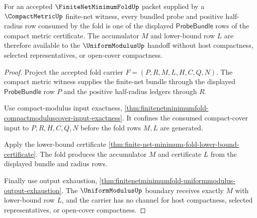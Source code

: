 \begin{theorem}
\label{thm:finitenetminimumfold-compactmetric-probe-consumption}
For an accepted $\FiniteNetMinimumFoldUp$ packet supplied by a $\CompactMetricUp$ finite-net witness, every bundled probe and positive half-radius row consumed by the fold is one of the displayed $\mathsf{ProbeBundle}$ rows of the compact metric certificate. The accumulator $M$ and lower-bound row $L$ are therefore available to the $\UniformModulusUp$ handoff without host compactness, selected representatives, or open-cover compactness.
\end{theorem}
\begin{proof}
Project the accepted fold carrier $F=(P,R,M,L,H,C,Q,N)$. The compact metric witness supplies the finite-net bundle through the displayed $\mathsf{ProbeBundle}$ row $P$ and the positive half-radius ledgers through $R$.

Use compact-modulus input exactness, \autoref{thm:finitenetminimumfold-compactmoduluscover-input-exactness}. It confines the consumed compact-cover input to $P,R,H,C,Q,N$ before the fold rows $M,L$ are generated.

Apply the lower-bound certificate \autoref{thm:finite-net-minimum-fold-lower-bound-certificate}. The fold produces the accumulator $M$ and certificate $L$ from the displayed bundle and radius rows.

Finally use output exhaustion, \autoref{thm:finitenetminimumfold-uniformmodulus-output-exhaustion}. The $\UniformModulusUp$ boundary receives exactly $M$ with lower-bound row $L$, and the carrier has no channel for host compactness, selected representatives, or open-cover compactness.
\end{proof}

